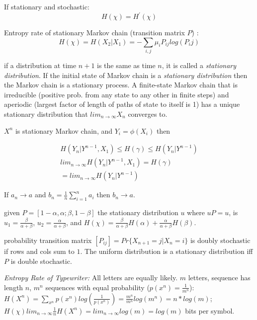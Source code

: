 \documentclass[10pt]{article}
\begin{document}
\begin{tiny}
\begin{multicols}{3}
\noindent If stationary and stochastic:
\begin{equation}
H(\chi) = H^\prime(\chi)
\end{equation}

\noindent Entropy rate of stationary Markov chain (transition matrix $P$) :
\begin{equation}
H(\chi) = H(X_2|X_1) = -\sum_{i,j} \mu_i P_{ij}log(P_ij)
\end{equation}

 if a distribution at time $n+1$ is the same as time $n$, it is called a {\it stationary distribution}. If the initial state of Markov chain is a {\it stationary distribution} then the Markov chain is a stationary process. A finite-state Markov chain that is irreducible (positive prob. from any state to any other in finite steps) and aperiodic (largest factor of length of paths of state to itself is 1) has a unique stationary distribution that $lim_{n \to \infty}X_n$ converges to.

$X^n$ is stationary Markov chain, and $Y_i = \phi(X_i)$ then

\begin{eqnarray*}
H(Y_n | Y^{n-1}, X_1) \leq H(\gamma) \leq H(Y_n|Y^{n-1})\\
lim_{n \to \infty}H(Y_n|Y^{n-1},X_1) = H(\gamma) \\
= lim_{n \to \infty} H(Y_n | Y^{n-1})
\end{eqnarray*}

 If $a_n \to a$ and $b_n = \frac{1}{n}\sum_{i=1}^n a_i$ then $b_n \to a$. 

 given $P=[1-\alpha, \alpha; \beta, 1-\beta]$ the stationary distribution $u$ where $uP = u$, is $u_1 = \frac{\beta}{\alpha+\beta}$, $u_2 = \frac{\alpha}{\alpha+\beta}$, and $H(\chi) = \frac{\beta}{\alpha + \beta}H(\alpha) + \frac{\alpha}{\alpha+\beta}H(\beta)$. 

 probability transition matrix $[P_{ij}] = Pr\{X_{n+1} = j | X_n = i\}$ is doubly stochastic if rows and cols sum to $1$. The uniform distribution is a stationary distribution iff $P$ is double stochastic.

\noindent
\textit{Entropy Rate of Typewriter:} All letters are equally likely. $m$ letters, sequence has length $n$, $m^n$ sequences with equal probability ($p(x^n) = \frac{1}{m^n}$): $H(X^n) = \sum_{x^n} p(x^n) log(\frac{1}{p(x^n)}) =  \frac{m^n}{m^n}log(m^n) = n*log(m)$; $H(\chi) lim_{n \to \infty} \frac{1}{n} H(X^n) = lim_{n \to \infty} log(m) = log(m)$ bits per symbol.


\end{multicols}
\end{tiny}
\end{document}

